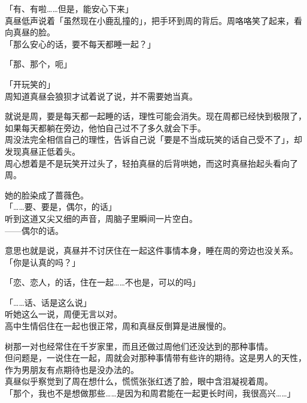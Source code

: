 「有、有啦……但是，能安心下来」\\

真昼低声说着「虽然现在小鹿乱撞的」，把手环到周的背后。周咯咯笑了起来，看向真昼的脸。\\

「那么安心的话，要不每天都睡一起？」

「那、那个，呃」

「开玩笑的」\\

周知道真昼会狼狈才试着说了说，并不需要她当真。

就说是周，要是每天都一起睡的话，理性可能会消失。现在周都已经快到极限了，如果每天都躺在旁边，他怕自己过不了多久就会下手。\\

周没法完全相信自己的理性，告诉自己说「要是不当成玩笑的话自己受不了」，却发现真昼正低着头。\\

周心想着是不是玩笑开过头了，轻拍真昼的后背哄她，而这时真昼抬起头看向了周。

她的脸染成了蔷薇色。\\

「……要、要是，偶尔，的话」\\

听到这道又尖又细的声音，周脑子里瞬间一片空白。\\

——偶尔的话。

意思也就是说，真昼并不讨厌住在一起这件事情本身，睡在周的旁边也没关系。\\

「你是认真的吗？」

「恋、恋人，的话，住在一起……不也是，可以的吗」

「……话、话是这么说」\\

听她这么一说，周便无言以对。\\

高中生情侣住在一起也很正常，周和真昼反倒算是进展慢的。

树那一对也经常住在千岁家里，而且还做过周他们还没达到的那种事情。\\

但问题是，一说住在一起，周就会对那种事情带有些许的期待。这是男人的天性，作为男朋友有点期待也是没办法的。\\

真昼似乎察觉到了周在想什么，慌慌张张红透了脸，眼中含泪凝视着周。\\

「那个，我也不是想做那些……是因为和周君能在一起更长时间，我很高兴……」


